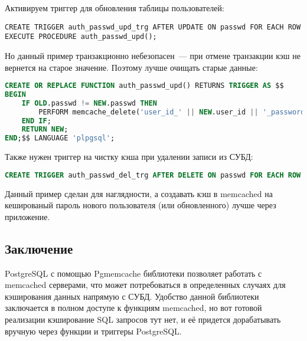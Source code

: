 Активируем триггер для обновления таблицы пользователей:

\begin{lstlisting}[label=lst:pgcache12,caption=Триггер]
CREATE TRIGGER auth_passwd_upd_trg AFTER UPDATE ON passwd FOR EACH ROW EXECUTE PROCEDURE auth_passwd_upd();
\end{lstlisting}

Но данный пример транзакционно небезопасен~--- при отмене транзакции кэш не вернется на старое значение. Поэтому лучше очищать старые данные:

\begin{lstlisting}[language=SQL,label=lst:pgcache13,caption=Очистка ключа в кэше]
CREATE OR REPLACE FUNCTION auth_passwd_upd() RETURNS TRIGGER AS $$
BEGIN
	IF OLD.passwd != NEW.passwd THEN
		PERFORM memcache_delete('user_id_' || NEW.user_id || '_password');
	END IF;
	RETURN NEW;
END;$$ LANGUAGE 'plpgsql';
\end{lstlisting}

Также нужен триггер на чистку кэша при удалении записи из СУБД:

\begin{lstlisting}[language=SQL,label=lst:pgcache14,caption=Триггер]
CREATE TRIGGER auth_passwd_del_trg AFTER DELETE ON passwd FOR EACH ROW EXECUTE PROCEDURE auth_passwd_upd();
\end{lstlisting}

Данный пример сделан для наглядности, а создавать кэш в memcached на кешированый пароль нового пользователя (или обновленного) лучше через приложение.


\subsection{Заключение}

PostgreSQL с помощью Pgmemcache библиотеки позволяет работать с memcached серверами, что может потребоваться в определенных случаях для кэширования данных напрямую с СУБД. Удобство данной библиотеки заключается в полном доступе к функциям memcached, но вот готовой реализации кэширование SQL запросов тут нет, и её придется дорабатывать вручную через функции и триггеры PostgreSQL.
